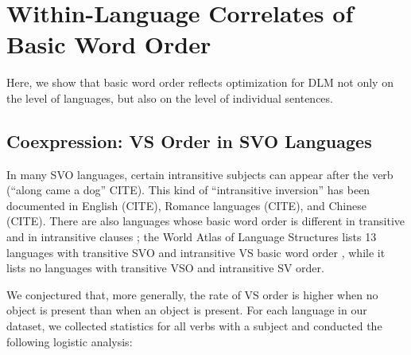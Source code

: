 \documentclass[11pt,a4paper]{article}
\begin{document}





\section{Within-Language Correlates of Basic Word Order}

Here, we show that basic word order reflects optimization for DLM not only on the level of languages, but also on the level of individual sentences.

\subsection{Coexpression: VS Order in SVO Languages}
In many SVO languages, certain intransitive subjects can appear after the verb (``along came a dog'' CITE).
This kind of ``intransitive inversion'' has been documented in English (CITE), Romance languages (CITE), and Chinese (CITE).
There are also languages whose basic word order is different in transitive and in intransitive clauses \citep{wals-82}; the World Atlas of Language Structures lists 13 languages with transitive SVO and intransitive VS basic word order \citep{wals-81,wals-82}, while it lists no languages with transitive VSO and intransitive SV order.


We conjectured that, more generally, the rate of VS order is higher when no object is present than when an object is present.
For each language in our dataset, we collected statistics for all verbs with a subject and conducted the following logistic analysis:
\end{document}
